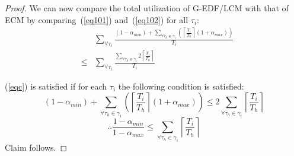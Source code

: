 \documentclass[conference]{sig-alternate}
\begin{document}
\begin{proof}
We can now compare the total utilization of G-EDF/LCM with that of ECM by comparing~(\ref{eq101}) and~(\ref{eq102}) for all $\tau_i$:
\begin{eqnarray}
& & \sum_{\forall \tau_{i}}\frac{(1-\alpha_{min})+\sum_{\forall \tau_{h}\in\gamma_{i}}\left(\left\lceil\frac{T_{i}}{T_{h}}\right\rceil(1+\alpha_{max})\right)}{T_{i}} \nonumber\\
& \le &   \sum_{\forall \tau_{i}}\frac{\sum_{\forall \tau_{h}\in\gamma_{i}}2\left\lceil\frac{T_{i}}{T_{h}}\right\rceil}{T_{i}}\label{eqc}\end{eqnarray}

(\ref{eqc}) is satisfied if for each $\tau_{i}$ the following condition is satisfied:
\begin{equation*}
(1-\alpha_{min})+\sum_{\forall \tau_h \in \gamma_i}\left(\left\lceil\frac{T_{i}}{T_{h}}\right\rceil(1+\alpha_{max})\right)  \le  2\sum_{\forall \tau_h \in \gamma_i}\left\lceil\frac{T_{i}}{T_{h}}\right\rceil
\end{equation*}
\begin{equation*}
\therefore\frac{1-\alpha_{min}}{1-\alpha_{max}}  \le  \sum_{\forall \tau_h \in \gamma_i}\left\lceil\frac{T_{i}}{T_{h}}\right\rceil
\end{equation*}
Claim follows.
\end{proof}
\end{document}
